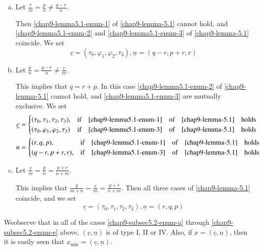 \begin{enumerate}[(a)]
\item Let $\frac{r}{m} = \frac{p}{n} \neq \frac{q-r}{n}$.\label{chap9-subsec5.2-enum-c}

Then \eqref{chap9-lemma5.1-enum-1} of \ref{chap9-lemma-5.1} cannot hold, and \eqref{chap9-lemma5.1-enum-2}
and \eqref{chap9-lemma5.1-enum-3} of \ref{chap9-lemma-5.1} coincide. We set
$$
\underline{c} = (\tau_{0}, \varphi_{1}, \varphi_{2}, \tau_{3}), \underline{n} = (q-r, p+r, r)
$$

\item Let $\frac{p}{n} = \frac{q-r}{n} \neq \frac{r}{m}$.\label{chap9-subsec5.2-enum-d}

This implies that $q=r +p$. In this case \eqref{chap9-lemma5.1-enum-2} of \ref{chap9-lemma-5.1} cannot hold,
and \eqref{chap9-lemma5.1-enum-3} are mutually exclusive. We set
\begin{align*}
\underline{c} &=
\begin{cases}
(\tau_{0}, \tau_{1}, \tau_{2}, \tau_{3}), & \text{if}\quad \eqref{chap9-lemma5.1-enum-1}\quad \text{of}\quad \ref{chap9-lemma-5.1}\quad \text{holds}\\
(\tau_{0}, \varphi_{1}, \varphi_{2}, \tau_{3}) & \text{if}\quad \eqref{chap9-lemma5.1-enum-3}\quad \text{of}\quad \ref{chap9-lemma-5.1}\quad \text{holds}
\end{cases}\\
n&=
\begin{cases}
(r,q,p), & \text{if} \quad \eqref{chap9-lemma5.1-enum-1}\quad \text{of}\quad \ref{chap9-lemma-5.1}\quad \text{holds}\\
(q-r,p+r, r), & \text{if} \quad \eqref{chap9-lemma5.1-enum-3}\quad \text{of}\quad \ref{chap9-lemma-5.1}\quad \text{holds}
\end{cases}
\end{align*}

\item Let $\frac{r}{m}= \frac{p}{n} = \frac{p+r}{n+m}$.

This implies that $\frac{q}{m+n} =\frac{r}{m}= \frac{p+r}{n+m}$. Then all three cases of \ref{chap9-lemma-5.1} coincide,
 and we set\label{chap9-subsec5.2-enum-e}
$$
\underline{c} = (\tau_{0}, \tau_{1}, \tau_{2}, \tau_{3}), \underline{n} = (r,q, p)
$$
\end{enumerate}

\setcounter{definition}{2}
\begin{secrem}\label{chap9-remark-5.4}
We\pageoriginale observe that in all of the cases \eqref{chap9-subsec5.2-enum-a} through \eqref{chap9-subsec5.2-enum-e} above, $(\underline{c}, \underline{n})$ is of type I, II or IV. Also, if $x = (\underline{c}, \underline{n})$, then it is easily seen that $x_{\min}= (\underline{c}, \underline{n})$.
\end{secrem}


